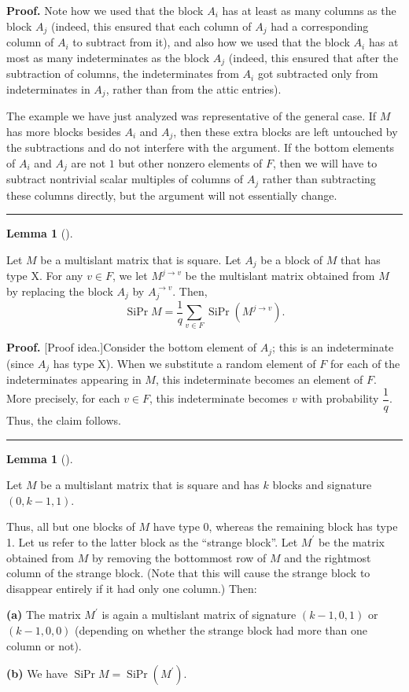 \documentclass[numbers=enddot,12pt,final,onecolumn,notitlepage]{scrartcl}%
\theoremstyle{definition}
\newtheorem{lem}[theo]{Lemma}
\newenvironment{lemma}[1][]
{\begin{lem}[#1]\begin{leftbar}}
{\end{leftbar}\end{lem}}
\newenvironment{proof}[1][Proof]{\noindent\textbf{#1.} }{\ \rule{0.5em}{0.5em}}
\let\sumnonlimits\sum
\renewcommand{\sum}{\sumnonlimits\limits}
\theoremstyle{plainsl}
\begin{document}
\begin{proof}
Note how we used that the block $A_{i}$ has at least as many columns as the
block $A_{j}$ (indeed, this ensured that each column of $A_{j}$ had a
corresponding column of $A_{i}$ to subtract from it), and also how we used
that the block $A_{i}$ has at most as many indeterminates as the block $A_{j}$
(indeed, this ensured that after the subtraction of columns, the
indeterminates from $A_{i}$ got subtracted only from indeterminates in $A_{j}%
$, rather than from the attic entries).

The example we have just analyzed was representative of the general case. If
$M$ has more blocks besides $A_{i}$ and $A_{j}$, then these extra blocks are
left untouched by the subtractions and do not interfere with the argument. If
the bottom elements of $A_{i}$ and $A_{j}$ are not $1$ but other nonzero
elements of $F$, then we will have to subtract nontrivial scalar multiples of
columns of $A_{j}$ rather than subtracting these columns directly, but the
argument will not essentially change.
\end{proof}

\begin{lemma}
\label{lem.multislant.redX}Let $M$ be a multislant matrix that is square. Let
$A_{j}$ be a block of $M$ that has type X. For any $v\in F$, we let
$M^{j\rightarrow v}$ be the multislant matrix obtained from $M$ by replacing
the block $A_{j}$ by $A_{j}^{\rightarrow v}$. Then,
\[
\operatorname*{SiPr}M=\dfrac{1}{q}\sum_{v\in F}\operatorname*{SiPr}\left(
M^{j\rightarrow v}\right)  .
\]

\end{lemma}

\begin{proof}
[Proof idea.]Consider the bottom element of $A_{j}$; this is an indeterminate
(since $A_{j}$ has type X). When we substitute a random element of $F$ for
each of the indeterminates appearing in $M$, this indeterminate becomes an
element of $F$. More precisely, for each $v\in F$, this indeterminate becomes
$v$ with probability $\dfrac{1}{q}$. Thus, the claim follows.
\end{proof}

\begin{lemma}
\label{lem.multislant.red01}Let $M$ be a multislant matrix that is square and
has $k$ blocks and signature $\left(  0,k-1,1\right)  $.

Thus, all but one blocks of $M$ have type 0, whereas the remaining block has
type 1. Let us refer to the latter block as the ``strange
block''. Let $M^{\prime}$ be the matrix obtained from $M$ by
removing the bottommost row of $M$ and the rightmost column of the strange
block. (Note that this will cause the strange block to disappear entirely if
it had only one column.) Then:

\textbf{(a)} The matrix $M^{\prime}$ is again a multislant matrix of signature
$\left(  k-1,0,1\right)  $ or $\left(  k-1,0,0\right)  $ (depending on whether
the strange block had more than one column or not).

\textbf{(b)} We have $\operatorname*{SiPr}M=\operatorname*{SiPr}\left(
M^{\prime}\right)  $.
\end{lemma}
\end{document}
